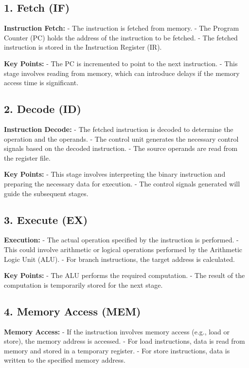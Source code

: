 \documentclass{report}
\begin{document}
\subsection{1. Fetch (IF)}

\textbf{Instruction Fetch:}
- The instruction is fetched from memory.
- The Program Counter (PC) holds the address of the instruction to be fetched.
- The fetched instruction is stored in the Instruction Register (IR).

\textbf{Key Points:}
- The PC is incremented to point to the next instruction.
- This stage involves reading from memory, which can introduce delays if the memory access time is significant.

\subsection{2. Decode (ID)}

\textbf{Instruction Decode:}
- The fetched instruction is decoded to determine the operation and the operands.
- The control unit generates the necessary control signals based on the decoded instruction.
- The source operands are read from the register file.

\textbf{Key Points:}
- This stage involves interpreting the binary instruction and preparing the necessary data for execution.
- The control signals generated will guide the subsequent stages.

\subsection{3. Execute (EX)}

\textbf{Execution:}
- The actual operation specified by the instruction is performed.
- This could involve arithmetic or logical operations performed by the Arithmetic Logic Unit (ALU).
- For branch instructions, the target address is calculated.

\textbf{Key Points:}
- The ALU performs the required computation.
- The result of the computation is temporarily stored for the next stage.

\subsection{4. Memory Access (MEM)}

\textbf{Memory Access:}
- If the instruction involves memory access (e.g., load or store), the memory address is accessed.
- For load instructions, data is read from memory and stored in a temporary register.
- For store instructions, data is written to the specified memory address.
\end{document}
